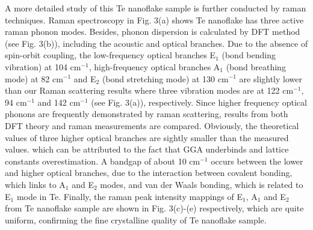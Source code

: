 \documentclass[journal=jacsat,manuscript=article]{achemso}
\begin{document}
A more detailed study of this Te nanoflake sample is further conducted by raman techniques. Raman spectroscopy in Fig. 3(a) shows Te nanoflake has three active raman phonon modes. Besides, phonon dispersion is calculated by DFT method (see Fig. 3(b)), including the acoustic and optical branches. Due to the absence of spin-orbit coupling, the low-frequency optical branches E$_1$ (bond bending vibration) at 104 cm$^{-1}$, high-frequency optical branches A$_1$ (bond breathing mode) at 82 cm$^{-1}$ and E$_2$ (bond stretching mode) at 130 cm$^{-1}$ are slightly lower than our Raman scattering results where three vibration modes are at 122 cm$^{-1}$, 94 cm$^{-1}$ and 142 cm$^{-1}$ (see Fig. 3(a)), respectively. Since higher frequency optical phonons are frequently demonstrated by raman scattering, results from both DFT theory and raman measurements are compared. Obviously, the theoretical values of three higher optical branches are sightly smaller than the measured values. which can be attributed to the fact that GGA underbinds and lattice constants overestimation\cite{peng2015anisotropic}. A bandgap of about 10 cm$^{-1}$ occurs between the lower and higher optical branches, due to the interaction between covalent bonding, which links to A$_1$ and E$_2$ modes, and van der Waals bonding, which is related to E$_1$ mode in Te\cite{martin1976intermolecular}.  Finally, the raman peak intensity mappings of E$_1$, A$_1$ and E$_2$ from Te nanoflake sample are shown in Fig. 3(c)-(e) respectively, which are quite uniform, confirming the fine crystalline quality of Te nanoflake sample.
\end{document}

